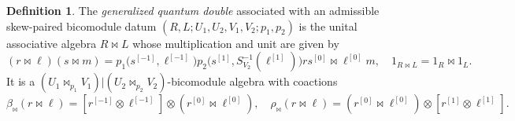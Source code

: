 \documentclass[a4paper,11pt]{article}
\theoremstyle{definition}
\newtheorem{definition}[theorem]{Definition}
\theoremstyle{remark}
\begin{document}
\begin{definition}
    The \emph{generalized quantum double} associated with an admissible skew-paired bicomodule datum $(R, L;U_1, U_2, V_1, V_2;p_1, p_2)$ is the unital associative algebra \(R\Join L\) whose multiplication
    and unit are given by
    \begin{equation}
        (r\Join\ell)(s\Join m) = p_1\bigl(s^{[-1]},\ell^{[-1]}\bigr) p_2\bigl(s^{[1]},S_{V_2}^{-1}(\ell^{[1]})\bigr) rs^{[0]}\Join\ell^{[0]}m, \quad 1_{R\Join L}=1_R\Join1_L.
    \end{equation}
    It is a \((U_1\Join_{p_1}V_1)|(U_2\Join_{p_2}V_2)\)-bicomodule
    algebra with coactions
    \begin{equation}\label{eq:QD-coaction}
        \beta_{\Join}(r\Join\ell) = [r^{[-1]}\otimes\ell^{[-1]}] \otimes(r^{[0]}\Join\ell^{[0]}),\quad 
        \rho_{\Join}(r\Join\ell) = (r^{[0]}\Join\ell^{[0]}) \otimes[r^{[1]}\otimes\ell^{[1]}].
    \end{equation}
\end{definition}
\end{document}
